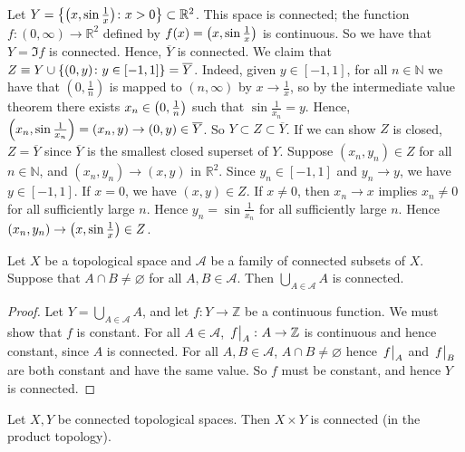 \begin{example}
	Let \( Y = \qty{\qty(x, \sin\frac{1}{x}) \colon x > 0} \subset \mathbb R^2 \).
	This space is connected; the function \( f \colon (0, \infty) \to \mathbb R^2 \) defined by \( f(x) = \qty(x,\sin \frac{1}{x}) \) is continuous.
	So we have that \( Y = \Im f \) is connected.
	Hence, \( \overline Y \) is connected.
	We claim that \( Z \equiv Y \cup \qty{(0,y) \colon y \in [-1,1]} = \overline Y \).
	Indeed, given \( y \in [-1,1] \), for all \( n \in \mathbb N \) we have that \( (0, \frac{1}{n}) \) is mapped to \( (n,\infty) \) by \( x \to \frac{1}{x} \), so by the intermediate value theorem there exists \( x_n \in \qty(0, \frac{1}{n}) \) such that \( \sin \frac{1}{x_n} = y \).
	Hence, \( \qty(x_n, \sin \frac{1}{x_n}) = (x_n, y) \to (0,y) \in \overline Y \).
	So \( Y \subset Z \subset \overline Y \).
	If we can show \( Z \) is closed, \( Z = \overline Y \) since \( \overline Y \) is the smallest closed superset of \( Y \).
	Suppose \( (x_n, y_n) \in Z \) for all \( n \in \mathbb N \), and \( (x_n, y_n) \to (x,y) \) in \( \mathbb R^2 \).
	Since \( y_n \in [-1,1] \) and \( y_n \to y \), we have \( y \in [-1,1] \).
	If \( x = 0 \), we have \( (x,y) \in Z \).
	If \( x \neq 0 \), then \( x_n \to x \) implies \( x_n \neq 0 \) for all sufficiently large \( n \).
	Hence \( y_n = \sin \frac{1}{x_n} \) for all sufficiently large \( n \).
	Hence \( (x_n, y_n) \to \qty(x, \sin \frac{1}{x}) \in Z \).
\end{example}
\begin{lemma}
	Let \( X \) be a topological space and \( \mathcal A \) be a family of connected subsets of \( X \).
	Suppose that \( A \cap B \neq \varnothing \) for all \( A, B \in \mathcal A \).
	Then \( \bigcup_{A \in \mathcal A} A \) is connected.
\end{lemma}
\begin{proof}
	Let \( Y = \bigcup_{A \in \mathcal A} A \), and let \( f \colon Y \to \mathbb Z \) be a continuous function.
	We must show that \( f \) is constant.
	For all \( A \in \mathcal A \), \( \eval{f}_A \colon A \to \mathbb Z \) is continuous and hence constant, since \( A \) is connected.
	For all \( A, B \in \mathcal A \), \( A \cap B \neq \varnothing \) hence \( \eval{f}_A \) and \( \eval{f}_B \) are both constant and have the same value.
	So \( f \) must be constant, and hence \( Y \) is connected.
\end{proof}
\begin{theorem}
	Let \( X, Y \) be connected topological spaces.
	Then \( X \times Y \) is connected (in the product topology).
\end{theorem}

